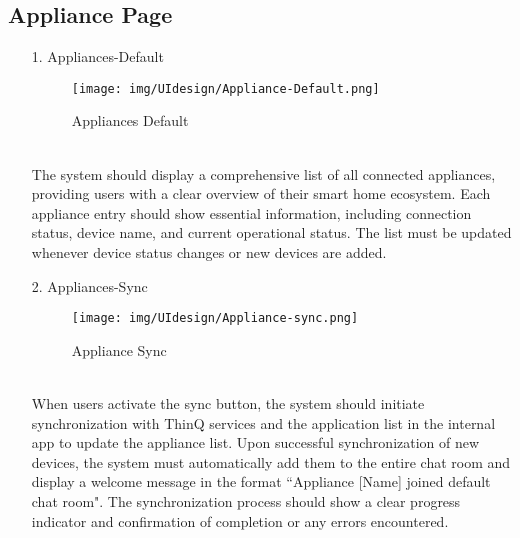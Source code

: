 \documentclass[conference]{IEEEtran}
\begin{document}
\subsection{Appliance Page}
    \begin{enumerate}
    \item[1.] Appliances-Default
    \begin{figure}[h]
\hspace{1.5cm}
\centering
\begin{minipage}{0.4\columnwidth}
    \texttt{[image: img/UIdesign/Appliance-Default.png]}
    \caption{Appliances Default}
\end{minipage}
\end{figure} \\
    The system should display a comprehensive list of all connected appliances, providing users with a clear overview of their smart home ecosystem. Each appliance entry should show essential information, including connection status, device name, and current operational status. The list must be updated whenever device status changes or new devices are added. \\ 
\end{enumerate}

\begin{enumerate}
    \item[2.] Appliances-Sync
    \begin{figure}[h]
\hspace{1.5cm}
\centering
\begin{minipage}{0.3\columnwidth}
    \texttt{[image: img/UIdesign/Appliance-sync.png]}
    \caption{Appliance Sync}
\end{minipage}
\end{figure} \\

    When users activate the sync button, the system should initiate synchronization with ThinQ services and the application list in the internal app to update the appliance list. Upon successful synchronization of new devices, the system must automatically add them to the entire chat room and display a welcome message in the format ``Appliance [Name] joined default chat room". The synchronization process should show a clear progress indicator and confirmation of completion or any errors encountered. \\
\end{enumerate}
\end{document}
